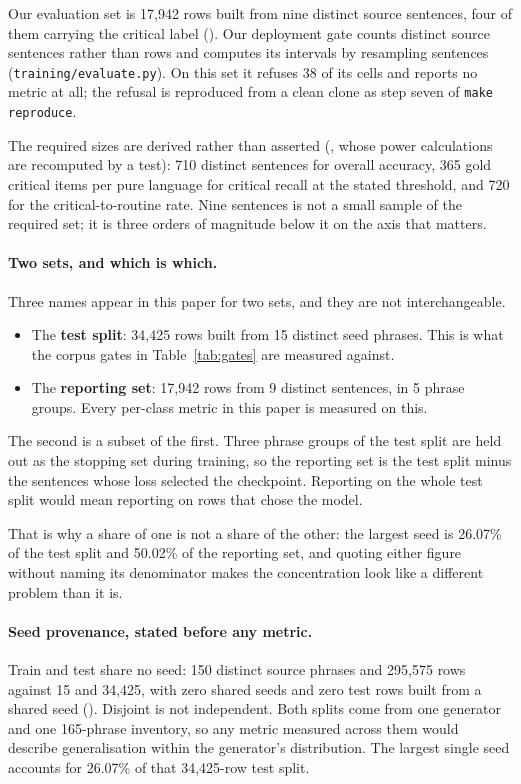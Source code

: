 Our evaluation set is 17{,}942 rows built from nine distinct source sentences,
four of them carrying the critical label ().
Our deployment gate counts distinct source sentences rather than rows and
computes its intervals by resampling sentences
(\texttt{training/evaluate.py}). On this set it refuses 38 of its cells and
reports no metric at all; the refusal is reproduced from a clean clone as step
seven of \texttt{make reproduce}.

The required sizes are derived rather than asserted
(, whose power calculations are recomputed by a
test): 710 distinct sentences for overall accuracy, 365 gold critical items per
pure language for critical recall at the stated threshold, and 720 for the
critical-to-routine rate. Nine sentences is not a small sample of the required
set; it is three orders of magnitude below it on the axis that matters.

\paragraph{Two sets, and which is which.} Three names appear in this paper for
two sets, and they are not interchangeable.

\begin{itemize}
\item The \textbf{test split}: 34{,}425 rows built from 15 distinct seed
  phrases. This is what the corpus gates in Table~\ref{tab:gates} are measured
  against.
\item The \textbf{reporting set}: 17{,}942 rows from 9 distinct sentences, in 5
  phrase groups. Every per-class metric in this paper is measured on this.
\end{itemize}

The second is a subset of the first. Three phrase groups of the test split are
held out as the stopping set during training, so the reporting set is the test
split minus the sentences whose loss selected the checkpoint. Reporting on the
whole test split would mean reporting on rows that chose the model.

That is why a share of one is not a share of the other: the largest seed is
26.07\% of the test split and 50.02\% of the reporting set, and quoting either
figure without naming its denominator makes the concentration look like a
different problem than it is.

\paragraph{Seed provenance, stated before any metric.} Train and test share no
seed: 150 distinct source phrases and 295{,}575 rows against 15 and 34{,}425,
with zero shared seeds and zero test rows built from a shared seed
(). Disjoint is not independent. Both splits
come from one generator and one 165-phrase inventory, so any metric measured
across them would describe generalisation within the generator's distribution.
The largest single seed accounts for 26.07\% of that 34{,}425-row test split.

